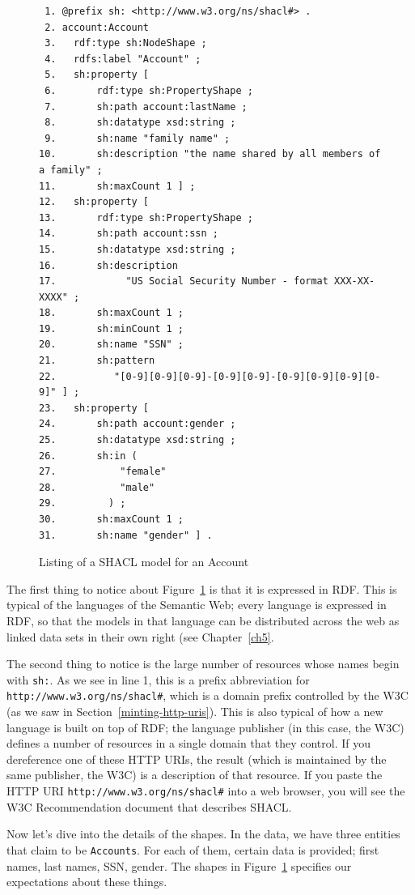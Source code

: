 \begin{figure}
  \begin{lstlisting}
 1. @prefix sh: <http://www.w3.org/ns/shacl#> .
 2. account:Account
 3.   rdf:type sh:NodeShape ;
 4.   rdfs:label "Account" ;
 5.   sh:property [
 6.       rdf:type sh:PropertyShape ;
 7.       sh:path account:lastName ;
 8.       sh:datatype xsd:string ;
 9.       sh:name "family name" ;
10.       sh:description "the name shared by all members of a family" ;
11.       sh:maxCount 1 ] ;
12.   sh:property [
13.       rdf:type sh:PropertyShape ;
14.       sh:path account:ssn ;
15.       sh:datatype xsd:string ;
16.       sh:description
17.            "US Social Security Number - format XXX-XX-XXXX" ;
18.       sh:maxCount 1 ;
19.       sh:minCount 1 ;
20.       sh:name "SSN" ;
21.       sh:pattern
22.          "[0-9][0-9][0-9]-[0-9][0-9]-[0-9][0-9][0-9][0-9]" ] ;
23.   sh:property [
24.       sh:path account:gender ;
25.       sh:datatype xsd:string ;
26.       sh:in (
27.           "female"
28.           "male"
29.         ) ;
30.       sh:maxCount 1 ;
31.       sh:name "gender" ] .
  \end{lstlisting}
  \caption{Listing of a SHACL model for an Account}
  \label{fig:ch7.account}
\end{figure}

The first thing to notice about Figure~\ref{fig:ch7.account} is that it is expressed in RDF.  This is typical of the languages of the Semantic Web; every language is expressed in RDF, so that the models in that language can be distributed across the web as linked data sets in their own right (see Chapter~\ref{ch5}. 

The second thing to notice is the large number of resources whose names
begin with \texttt{sh:}.  As we see in line 1, this is a prefix abbreviation for
\texttt{http://www.w3.org/ns/shacl\#}, which is a domain prefix controlled by the
W3C (as we saw in Section~\ref{minting-http-uris}).  This is also typical of how a
new language is built on top of RDF; the language publisher (in this case, the W3C)
defines a number of resources in a single domain that they control.  If you dereference
one of these HTTP URIs, the result (which is maintained by the same publisher, the W3C) is a 
description of that resource.  If you paste the HTTP URI 
\texttt{http://www.w3.org/ns/shacl\#} into a web browser, you will see the W3C 
Recommendation document that describes SHACL.


Now let's dive into the details of the shapes.  
In the data, we have three entities that claim to be \texttt{Accounts}.  For
each of them, certain data is provided; first names, last names, SSN, gender.
The shapes in Figure~\ref{fig:ch7.account} specifies our expectations about these
things.

